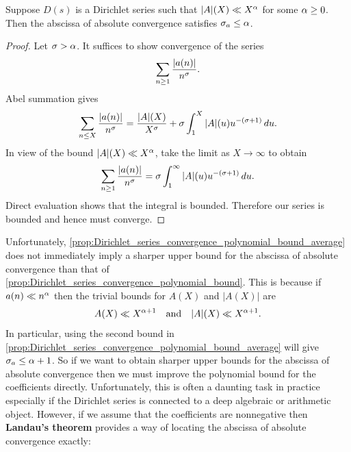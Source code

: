     \begin{proposition}\label{prop:Dirichlet_series_convergence_polynomial_bound_average}
      Suppose \(D(s)\) is a Dirichlet series such that \(|A|(X) \ll X^{\alpha}\) for some \(\alpha \ge 0\). Then the abscissa of absolute convergence satisfies \(\sigma_{a} \le \alpha\).
    \end{proposition}
    \begin{proof}
      Let \(\sigma > \alpha\). It suffices to show convergence of the series
      \[
        \sum_{n \ge 1}\frac{|a(n)|}{n^{\sigma}}.
      \]
      Abel summation gives
      \[
        \sum_{n \le X}\frac{|a(n)|}{n^{\sigma}} = \frac{|A|(X)}{X^{\sigma}}+\sigma\int_{1}^{X}|A|(u)u^{-(\sigma+1)}\,du.
      \]
      In view of the bound \(|A|(X) \ll X^{\alpha}\), take the limit as \(X \to \infty\) to obtain
      \[
        \sum_{n \ge 1}\frac{|a(n)|}{n^{\sigma}} = \sigma\int_{1}^{\infty}|A|(u)u^{-(\sigma+1)}\,du.
      \]
      Direct evaluation shows that the integral is bounded. Therefore our series is bounded and hence must converge.
    \end{proof}

    Unfortunately, \cref{prop:Dirichlet_series_convergence_polynomial_bound_average} does not immediately imply a sharper upper bound for the abscissa of absolute convergence than that of \cref{prop:Dirichlet_series_convergence_polynomial_bound}. This is because if \(a(n) \ll n^{\alpha}\) then the trivial bounds for \(A(X)\) and \(|A(X)|\) are
    \[
      A(X) \ll X^{\alpha+1} \quad \text{and} \quad |A|(X) \ll X^{\alpha+1}.
    \]
    In particular, using the second bound in \cref{prop:Dirichlet_series_convergence_polynomial_bound_average} will give \(\sigma_{a} \le \alpha+1\). So if we want to obtain sharper upper bounds for the abscissa of absolute convergence then we must improve the polynomial bound for the coefficients directly. Unfortunately, this is often a daunting task in practice especially if the Dirichlet series is connected to a deep algebraic or arithmetic object. However, if we assume that the coefficients are nonnegative then \textbf{Landau's theorem} provides a way of locating the abscissa of absolute convergence exactly:

